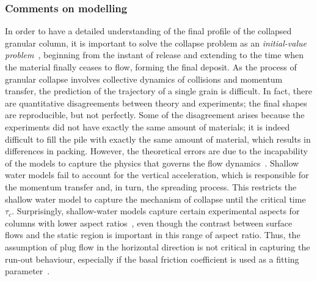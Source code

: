 \subsubsection{Comments on modelling}
In order to have a detailed understanding of the final profile of the collapsed 
granular column, it is important to solve the collapse problem as an 
\textit{initial-value problem}~\citep{Balmforth2005}, beginning from the 
instant of release and extending to the time when the material finally ceases 
to flow, forming the final deposit. As the process of granular collapse 
involves collective dynamics of collisions and momentum transfer, the 
prediction of the trajectory of a single grain is difficult. In fact, there are 
quantitative disagreements between theory and experiments; the final shapes are 
reproducible, but not perfectly. Some of the disagreement arises because the 
experiments did not have exactly the same amount of materials; it is indeed 
difficult to fill the pile with exactly the same amount of material, which 
results in differences in packing. However, the theoretical errors are due to 
the incapability of the models to capture the physics that governs the flow 
dynamics~\citep{Balmforth2005}. Shallow water models fail to account for the 
vertical acceleration, which is responsible for the momentum transfer and, in 
turn, the spreading process. This restricts the shallow water model to capture 
the mechanism of collapse until the critical time $\tau_{\textit{c}}$. 
Surprisingly, shallow-water models capture certain experimental aspects for 
columns with lower aspect 
ratios~\citep{Mangeney2010,Balmforth2005,Kerswell2005dam}, even though the 
contrast between surface flows and the static region is important in this range 
of aspect ratio. Thus, the assumption of plug flow in the horizontal direction 
is not critical in capturing the run-out behaviour, especially if the basal 
friction coefficient is used as a fitting parameter~\citep{Lajeunesse2005}. 

